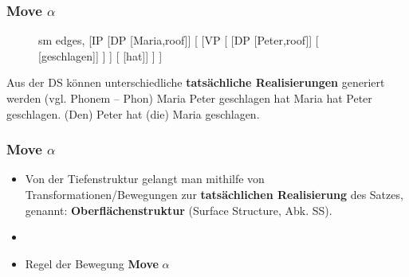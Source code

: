 \begin{frame}
\frametitle{Move $\alpha$}

\begin{figure}[b]
  	\begin{minipage}[b]{0.70\textwidth}
	\centering
	\scriptsize{
		\begin{forest}
		sm edges,
		[IP [DP [Maria,roof]]
			[ 
				[VP 
					[ 
						[DP [Peter,roof]]
						[ [geschlagen]]
					]
				]
				[ [hat]]
			]
		]
		\end{forest}
		}
  	\end{minipage}  
\end{figure}

Aus der DS können unterschiedliche \textbf{tatsächliche Realisierungen} generiert werden (vgl. Phonem -- Phon)
\eal
\ex Maria Peter geschlagen hat
\ex Maria hat Peter geschlagen.
\ex (Den) Peter hat (die) Maria geschlagen.
\zl

\end{frame}


\begin{frame}
\frametitle{Move $\alpha$}

\begin{itemize}
	\item Von der Tiefenstruktur gelangt man mithilfe von Transformationen/Bewegungen zur \textbf{tatsächlichen Realisierung} des Satzes, genannt: \textbf{Oberflächenstruktur} (Surface Structure, Abk. SS).
	\item[]
	\item Regel der Bewegung \ras \textbf{Move} $\alpha$
\end{itemize}

\end{frame}


